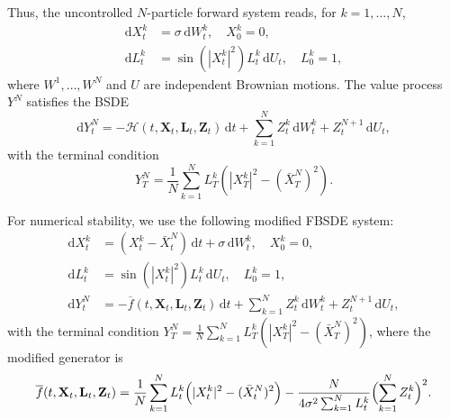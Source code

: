 \documentclass[11pt]{article}
\numberwithin{equation}{section}
\theoremstyle{plain}
\theoremstyle{definition}
\theoremstyle{remark}
\newcommand{\dd}{\mathrm{d}}
\begin{document}
	Thus, the uncontrolled $N$-particle forward system reads, for $k = 1, \dots, N$, 
	\begin{equation} \label{eq:ex2-fbsde-forward}
		\begin{aligned}
			\dd X_t^k &= \sigma \,\dd W_t^k, \quad X_0^k = 0, \\
			\dd L_t^k &= \sin(|X_t^k|^2)L_t^k\,\dd U_t, \quad L_0^k = 1, 
		\end{aligned}
	\end{equation}
	where $W^1, \dots, W^N$ and $U$ are independent Brownian motions. The value process $Y^N$ satisfies the BSDE 
	\begin{equation} \label{eq:ex2-fbsde-backward}
		\dd Y_t^N = -\mathcal{H}(t, \mathbf{X}_t,\mathbf{L}_t,\mathbf{Z}_t)\,\dd t + \sum_{k=1}^N Z_t^k \,\dd W_t^k + Z_t^{N+1}\,\dd U_t,
	\end{equation}
	with the terminal condition 
	\begin{equation*}
		Y_T^N = \frac{1}{N}\sum_{k=1}^N L_T^k
		\left(|X_T^k|^2 - (\bar{X}_T^N)^2\right).
	\end{equation*}
	
		For numerical stability, we use the following modified FBSDE system:
	\begin{equation} \label{eq:ex2-fbsde-numerics}
		\begin{aligned}
			\dd X_t^k &= (X_t^k - \bar{X}_t^N)\,\dd t + \sigma \,\dd W_t^k, \quad X_0^k = 0, \\
			\dd L_t^k &= \sin(|X_t^k|^2)L_t^k\,\dd U_t, \quad L_0^k=1, \\
			\dd Y_t^N &= -\overline{f}(t, \mathbf{X}_t, \mathbf{L}_t, \mathbf{Z}_t)\,\dd t + \sum_{k=1}^N Z_t^k \,\dd W_t^k + Z_t^{N+1}\,\dd U_t,
		\end{aligned}
	\end{equation}
	with the terminal condition $Y_T^N = \frac{1}{N}\sum_{k=1}^N L_T^k \left(|X_T^k|^2 - (\bar{X}_T^N)^2\right)$, where the modified generator is 
	\begin{equation*}
		\overline{f}(t, \mathbf{X}_t, \mathbf{L}_t, \mathbf{Z}_t) = \frac{1}{N}\sum_{k=1}^N L_t^k
		\Bigl(|X_t^k|^2 - (\bar{X}_t^N)^2\Bigr)
		- \frac{N}{4\sigma^2 \sum_{k=1}^N L_t^k}
		\Bigl(\sum_{k=1}^N Z_t^k\Bigr)^2. 
	\end{equation*}
	
\end{document}
